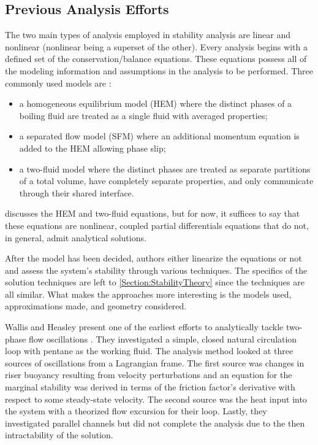 \subsection{Previous Analysis Efforts}
The two main types of analysis employed in stability analysis are linear and nonlinear (nonlinear being a superset of the other).
Every analysis begins with a defined set of the conservation/balance equations.
These equations possess all of the modeling information and assumptions in the analysis to be performed.
Three commonly used models are \cite{johnson_handbook_1998}:
\begin{itemize}
    \item{a homogeneous equilibrium model (HEM) where the distinct phases of a boiling fluid are treated as a single fluid with averaged properties;}
    \item{a separated flow model (SFM) where an additional momentum equation is added to the HEM allowing phase slip;}
    \item{a two-fluid model where the distinct phases are treated as separate partitions of a total volume, have completely separate properties, and only communicate through their shared interface.}
\end{itemize}
 discusses the HEM and two-fluid equations, but for now, it suffices to say that these equations are nonlinear, coupled partial differentials equations that do not, in general, admit analytical solutions.

After the model has been decided, authors either linearize the equations or not and assess the system's stability through various techniques.
The specifics of the solution techniques are left to \cref{Section:StabilityTheory} since the techniques are all similar.
What makes the approaches more interesting is the models used, approximations made, and geometry considered.

Wallis and Heasley present one of the earliest efforts to analytically tackle two-phase flow oscillations \cite{wallis_oscillations_1961}.
They investigated a simple, closed natural circulation loop with pentane as the working fluid.
The analysis method looked at three sources of oscillations from a Lagrangian frame.
The first source was changes in riser buoyancy resulting from velocity perturbations and an equation for the marginal stability was derived in terms of the friction factor's derivative with respect to some steady-state velocity.
The second source was the heat input into the system with a theorized flow excursion for their loop.
Lastly, they investigated parallel channels but did not complete the analysis due to the then intractability of the solution.

